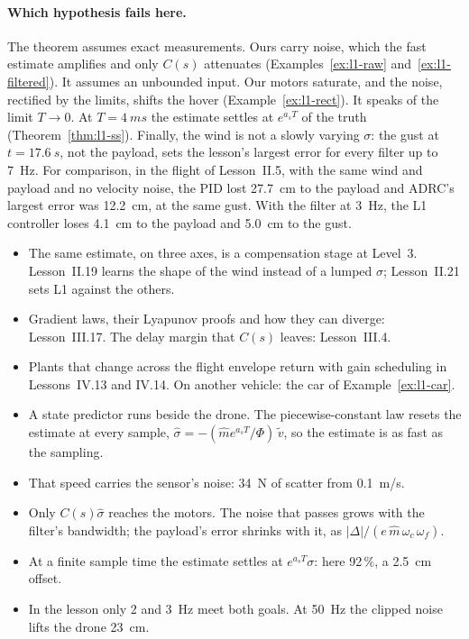 \paragraph{Which hypothesis fails here.} The theorem assumes exact measurements. Ours carry noise, which the fast estimate amplifies and only $C(s)$ attenuates (Examples~\ref{ex:l1-raw} and~\ref{ex:l1-filtered}). It assumes an unbounded input. Our motors saturate, and the noise, rectified by the limits, shifts the hover (Example~\ref{ex:l1-rect}). It speaks of the limit $T \to 0$. At $T = \SI{4}{ms}$ the estimate settles at $e^{a_sT}$ of the truth (Theorem~\ref{thm:l1-ss}). Finally, the wind is not a slowly varying $\sigma$: the gust at $t = \SI{17.6}{s}$, not the payload, sets the lesson's largest error for every filter up to \SI{7}{Hz}. For comparison, in the flight of Lesson~II.5, with the same wind and payload and no velocity noise, the PID lost \SI{27.7}{cm} to the payload and ADRC's largest error was \SI{12.2}{cm}, at the same gust. With the filter at \SI{3}{Hz}, the L1 controller loses \SI{4.1}{cm} to the payload and \SI{5.0}{cm} to the gust.

\begin{lookahead}
\begin{itemize}[leftmargin=1.2em]
  \item The same estimate, on three axes, is a compensation stage at Level~3. Lesson~II.19 learns the shape of the wind instead of a lumped $\sigma$; Lesson~II.21 sets L1 against the others.
  \item Gradient laws, their Lyapunov proofs and how they can diverge: Lesson~III.17. The delay margin that $C(s)$ leaves: Lesson~III.4.
  \item Plants that change across the flight envelope return with gain scheduling in Lessons~IV.13 and IV.14. On another vehicle: the car of Example~\ref{ex:l1-car}.
\end{itemize}
\end{lookahead}

\begin{remember}
\begin{itemize}
  \item A state predictor runs beside the drone. The piecewise-constant law resets the estimate at every sample, $\hat\sigma = -(\hat m e^{a_sT}/\Phi)\,\tilde v$, so the estimate is as fast as the sampling.
  \item That speed carries the sensor's noise: \SI{34}{N} of scatter from \SI{0.1}{m/s}.
  \item Only $C(s)\hat\sigma$ reaches the motors. The noise that passes grows with the filter's bandwidth; the payload's error shrinks with it, as $|\Delta|/(e\,\hat m\,\omega_c\,\omega_f)$.
  \item At a finite sample time the estimate settles at $e^{a_sT}\sigma$: here 92\,\%, a \SI{2.5}{cm} offset.
  \item In the lesson only 2 and \SI{3}{Hz} meet both goals. At \SI{50}{Hz} the clipped noise lifts the drone \SI{23}{cm}.
\end{itemize}
\end{remember}

